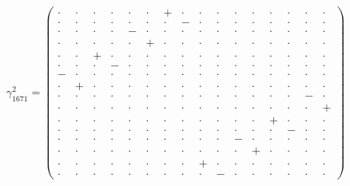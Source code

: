 \documentclass[
  10pt,
]{article}
\begin{document}
\[\gamma_{1671}^2=\left(\begin{smallmatrix} \cdot & \cdot & \cdot & \cdot & \cdot & \cdot & + & \cdot & \cdot & \cdot & \cdot & \cdot & \cdot & \cdot & \cdot & \cdot \\ \cdot & \cdot & \cdot & \cdot & \cdot & \cdot & \cdot & - & \cdot & \cdot & \cdot & \cdot & \cdot & \cdot & \cdot & \cdot \\ \cdot & \cdot & \cdot & \cdot & - & \cdot & \cdot & \cdot & \cdot & \cdot & \cdot & \cdot & \cdot & \cdot & \cdot & \cdot \\ \cdot & \cdot & \cdot & \cdot & \cdot & + & \cdot & \cdot & \cdot & \cdot & \cdot & \cdot & \cdot & \cdot & \cdot & \cdot \\ \cdot & \cdot & + & \cdot & \cdot & \cdot & \cdot & \cdot & \cdot & \cdot & \cdot & \cdot & \cdot & \cdot & \cdot & \cdot \\ \cdot & \cdot & \cdot & - & \cdot & \cdot & \cdot & \cdot & \cdot & \cdot & \cdot & \cdot & \cdot & \cdot & \cdot & \cdot \\ - & \cdot & \cdot & \cdot & \cdot & \cdot & \cdot & \cdot & \cdot & \cdot & \cdot & \cdot & \cdot & \cdot & \cdot & \cdot \\ \cdot & + & \cdot & \cdot & \cdot & \cdot & \cdot & \cdot & \cdot & \cdot & \cdot & \cdot & \cdot & \cdot & \cdot & \cdot \\ \cdot & \cdot & \cdot & \cdot & \cdot & \cdot & \cdot & \cdot & \cdot & \cdot & \cdot & \cdot & \cdot & \cdot & - & \cdot \\ \cdot & \cdot & \cdot & \cdot & \cdot & \cdot & \cdot & \cdot & \cdot & \cdot & \cdot & \cdot & \cdot & \cdot & \cdot & + \\ \cdot & \cdot & \cdot & \cdot & \cdot & \cdot & \cdot & \cdot & \cdot & \cdot & \cdot & \cdot & + & \cdot & \cdot & \cdot \\ \cdot & \cdot & \cdot & \cdot & \cdot & \cdot & \cdot & \cdot & \cdot & \cdot & \cdot & \cdot & \cdot & - & \cdot & \cdot \\ \cdot & \cdot & \cdot & \cdot & \cdot & \cdot & \cdot & \cdot & \cdot & \cdot & - & \cdot & \cdot & \cdot & \cdot & \cdot \\ \cdot & \cdot & \cdot & \cdot & \cdot & \cdot & \cdot & \cdot & \cdot & \cdot & \cdot & + & \cdot & \cdot & \cdot & \cdot \\ \cdot & \cdot & \cdot & \cdot & \cdot & \cdot & \cdot & \cdot & + & \cdot & \cdot & \cdot & \cdot & \cdot & \cdot & \cdot \\ \cdot & \cdot & \cdot & \cdot & \cdot & \cdot & \cdot & \cdot & \cdot & - & \cdot & \cdot & \cdot & \cdot & \cdot & \cdot \end{smallmatrix}\right)\qquad
\]
\end{document}
